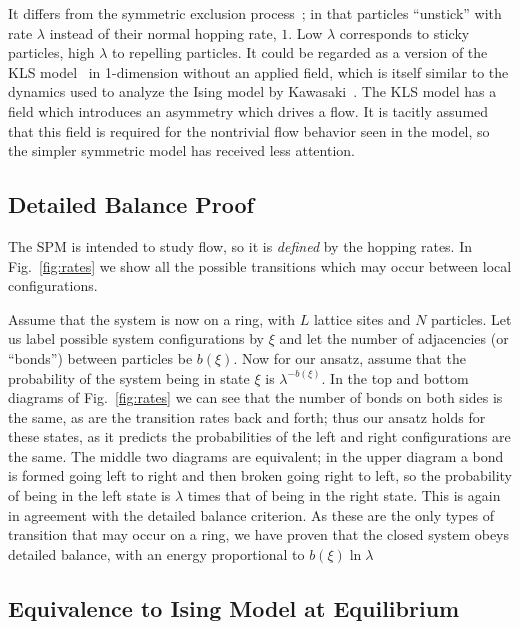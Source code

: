 \documentclass[
reprint, amsmath,amssymb,
]{revtex4-1}
\begin{document}
It differs from the symmetric exclusion
process~\cite{sugden2007dynamically, Kollmann2003, Lin2005,
  Hegde2014,Krapivsky2014, Imamura2017}; in that particles ``unstick''
with rate $\lambda$ instead of their normal hopping rate, $1$.  Low
$\lambda$ corresponds to sticky particles, high $\lambda$ to repelling
particles.
It could be regarded as a version of the KLS model~\cite{Katz1984,
  Zia2010, Kafri2003} in 1-dimension without an applied field, which
is itself similar to the dynamics used to analyze the Ising model by
Kawasaki~\cite{PhysRev.145.224}.  The KLS model has a field which
introduces an asymmetry which drives a flow.  It is tacitly assumed
that this field is required for the nontrivial flow behavior seen in
the model, so the simpler symmetric model has received less attention.


\subsection{Detailed Balance Proof} 
The SPM is intended to study flow, so it is {\it defined} by the
hopping rates.  In Fig.~\ref{fig:rates} we
show all the possible transitions which may occur between local
configurations. 

Assume that the system is now on a ring, with $L$
lattice sites and $N$ particles.  Let us label possible system
configurations by $\xi$ and let the number of adjacencies (or
``bonds'') between particles be $b(\xi)$. Now for our ansatz, assume
that the probability of the system being in state $\xi$ is
$\lambda^{-b(\xi)}$.  In the top and bottom diagrams of
Fig.~\ref{fig:rates} we can see that the number of bonds on
both sides is the same, as are the transition rates back and forth;
thus our ansatz holds for these states, as it predicts the
probabilities of the left and right configurations are the same. The
middle two diagrams are equivalent; in the upper diagram a
bond is formed going left to right and then broken going right to
left, so the probability of being in the left state is $\lambda$ times
that of being in the right state. This is again in agreement with the
detailed balance criterion. As these are the only types of transition
that may occur on a ring, we have proven that the closed system obeys
detailed balance, with an energy proportional to $b(\xi) \ln {\lambda}$

\subsection{Equivalence to Ising Model at Equilibrium}
\end{document}
